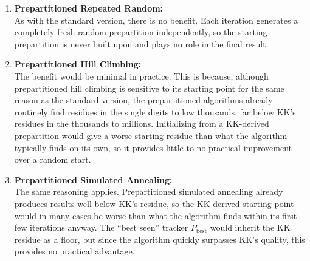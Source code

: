 \documentclass[11pt]{article}
\begin{document}
\begin{enumerate}
    \item \textbf{Prepartitioned Repeated Random:} \\
    As with the standard version, there is no benefit. Each iteration generates a completely fresh random prepartition independently, so the starting prepartition is never built upon and plays no role in the final result.

    \item \textbf{Prepartitioned Hill Climbing:} \\
    The benefit would be minimal in practice. This is because, although prepartitioned hill climbing is sensitive to its starting point for the same reason as the standard version, the prepartitioned algorithms already routinely find residues in the single digits to low thousands, far below KK's residues in the thousands to millions. Initializing from a KK-derived prepartition would give a worse starting residue than what the algorithm typically finds on its own, so it provides little to no practical improvement over a random start.

    \item \textbf{Prepartitioned Simulated Annealing:} \\
    The same reasoning applies. Prepartitioned simulated annealing already produces results well below KK's residue, so the KK-derived starting point would in many cases be worse than what the algorithm finds within its first few iterations anyway. The ``best seen'' tracker $P_{\text{best}}$ would inherit the KK residue as a floor, but since the algorithm quickly surpasses KK's quality, this provides no practical advantage.
\end{enumerate}
\end{document}

